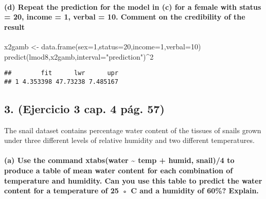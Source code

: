 \documentclass[
]{article}
\newenvironment{Shaded}{\begin{snugshade}}{\end{snugshade}}
\newcommand{\AttributeTok}[1]{\textcolor[rgb]{0.77,0.63,0.00}{#1}}
\newcommand{\DecValTok}[1]{\textcolor[rgb]{0.00,0.00,0.81}{#1}}
\newcommand{\FunctionTok}[1]{\textcolor[rgb]{0.00,0.00,0.00}{#1}}
\newcommand{\NormalTok}[1]{#1}
\newcommand{\OtherTok}[1]{\textcolor[rgb]{0.56,0.35,0.01}{#1}}
\newcommand{\SpecialCharTok}[1]{\textcolor[rgb]{0.00,0.00,0.00}{#1}}
\newcommand{\StringTok}[1]{\textcolor[rgb]{0.31,0.60,0.02}{#1}}
\begin{document}
\hypertarget{d-repeat-the-prediction-for-the-model-in-c-for-a-female-with-status-20-income-1-verbal-10.-comment-on-the-credibility-of-the-result}{%
\paragraph{(d) Repeat the prediction for the model in (c) for a female
with status = 20, income = 1, verbal = 10. Comment on the credibility of
the
result}\label{d-repeat-the-prediction-for-the-model-in-c-for-a-female-with-status-20-income-1-verbal-10.-comment-on-the-credibility-of-the-result}}

\begin{Shaded}
\begin{Highlighting}[]
\NormalTok{x2gamb }\OtherTok{\textless{}{-}} \FunctionTok{data.frame}\NormalTok{(}\AttributeTok{sex=}\DecValTok{1}\NormalTok{,}\AttributeTok{status=}\DecValTok{20}\NormalTok{,}\AttributeTok{income=}\DecValTok{1}\NormalTok{,}\AttributeTok{verbal=}\DecValTok{10}\NormalTok{)}
 \FunctionTok{predict}\NormalTok{(lmod8,x2gamb,}\AttributeTok{interval=}\StringTok{"prediction"}\NormalTok{)}\SpecialCharTok{\^{}}\DecValTok{2}
\end{Highlighting}
\end{Shaded}

\begin{verbatim}
##        fit      lwr      upr
## 1 4.353398 47.73238 7.485167
\end{verbatim}

\hypertarget{ejercicio-3-cap.-4-puxe1g.-57}{%
\subsection{3. (Ejercicio 3 cap. 4 pág.
57)}\label{ejercicio-3-cap.-4-puxe1g.-57}}

The snail dataset contains percentage water content of the tissues of
snails grown under three different levels of relative humidity and two
different temperatures.

\hypertarget{a-use-the-command-xtabswater-temp-humid-snail4-to-produce-a-table-of-mean-water-content-for-each-combination-of-temperature-and-humidity.-can-you-use-this-table-to-predict-the-water-content-for-a-temperature-of-25-c-and-a-humidity-of-60-explain.}{%
\paragraph{(a) Use the command xtabs(water \textasciitilde{} temp +
humid, snail)/4 to produce a table of mean water content for each
combination of temperature and humidity. Can you use this table to
predict the water content for a temperature of 25 ◦ C and a humidity of
60\%?
Explain.}\label{a-use-the-command-xtabswater-temp-humid-snail4-to-produce-a-table-of-mean-water-content-for-each-combination-of-temperature-and-humidity.-can-you-use-this-table-to-predict-the-water-content-for-a-temperature-of-25-c-and-a-humidity-of-60-explain.}}
\end{document}
